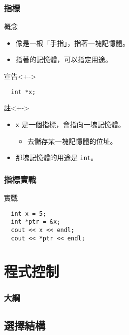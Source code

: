 \documentclass[utf8]{beamer}
\begin{document}
\begin{CJK}{UTF8}{bkai}
\begin{frame}[fragile]
  \frametitle{指標}
  \begin{block}{概念}
    \begin{itemize}[<+->]
    \item 像是一根「\alert{手指}」，指著一塊記憶體。
    \item<+-> 指著的記憶體，可以指定用途。
    \end{itemize}
  \end{block}
  \begin{alertblock}{宣告}<+->
    \begin{lstlisting}
  int *x;
    \end{lstlisting}
  \end{alertblock}
  \begin{exampleblock}{註}<+->
    \begin{itemize}
    \item \lstinline{x}{} 是一個指標，會指向一塊記憶體。
      \begin{itemize}[<+->]
      \item 去\alert{儲存}某一塊記憶體的\alert{位址}。
      \end{itemize}
    \item<+-> 那塊記憶體的用途是 \lstinline{int}{}。
    \end{itemize}
  \end{exampleblock}
\end{frame}

\begin{frame}[fragile]
  \frametitle{指標實戰}
  \begin{block}{實戰}
    \begin{lstlisting}
  int x = 5;
  int *ptr = &x;
  cout << x << endl;
  cout << *ptr << endl;
    \end{lstlisting}
  \end{block}
\end{frame}

\section{程式控制}
\begin{frame}
  \frametitle{大綱}
  \begin{multicols}{2}
    \tableofcontents[currentsection]
  \end{multicols}
\end{frame}

\subsection{選擇結構}

\end{CJK}
\end{document}
